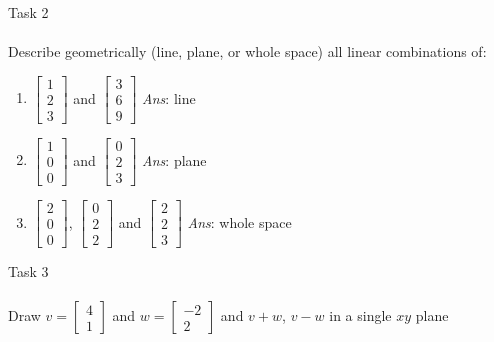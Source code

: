\documentclass[aspectratio=169]{beamer}
\begin{document}
\begin{frame}[t]{Task 2}
\framesubtitle{}
    Describe geometrically (line, plane, or whole space) all linear combinations of:
        \begin{enumerate}
            \item $\begin{bmatrix}1 \\ 2 \\3 \end{bmatrix}$ and $\begin{bmatrix}3 \\ 6 \\9 \end{bmatrix}$  {\alert{\textit{Ans}: line}}
            \item $\begin{bmatrix}1 \\ 0 \\0 \end{bmatrix}$ and $\begin{bmatrix}0 \\ 2 \\3 \end{bmatrix}$  {\alert{\textit{Ans}: plane}}
            \item $\begin{bmatrix}2 \\ 0 \\0 \end{bmatrix}$, $\begin{bmatrix}0 \\ 2 \\2 \end{bmatrix}$ and $\begin{bmatrix}2 \\ 2 \\3 \end{bmatrix}$  {\alert{\textit{Ans}: whole space}}
        \end{enumerate}
\end{frame}

\begin{frame}[c]{Task 3}
\framesubtitle{}\centering\large
    Draw $v = \begin{bmatrix}4 \\1 \end{bmatrix}$ and $w = \begin{bmatrix}-2 \\ 2 \end{bmatrix}$ and $ v + w $, $v-w$ in a single $xy$ plane
\end{frame}
\end{document}
